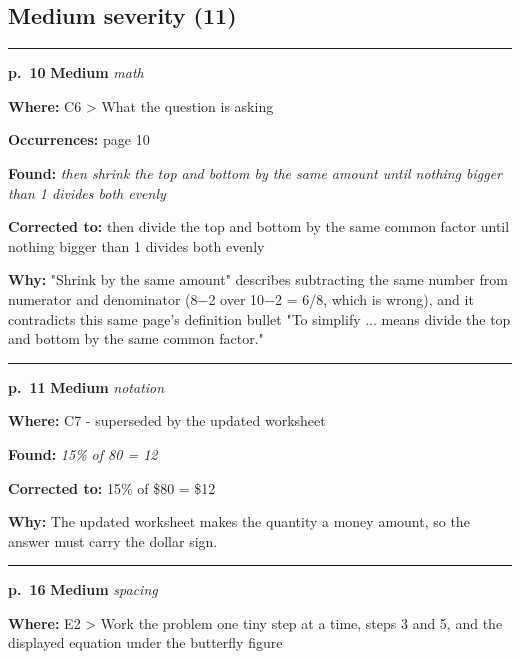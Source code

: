 \documentclass[11pt]{article}
\newcommand{\sevmed}[1]{\textcolor{orange!80!black}{\textbf{#1}}}
\begin{document}
\subsection*{Medium severity (11)}
\noindent\rule{\textwidth}{0.4pt}\par\nobreak\vspace{2pt}
\noindent\textbf{p.~10} \quad \sevmed{Medium} \quad \textit{math}\par
\noindent\textbf{Where: }C6 > What the question is asking\par
\noindent\textbf{Occurrences: }page 10\par
\noindent\textbf{Found: }\textit{then shrink the top and bottom by the same amount until nothing bigger than 1 divides both evenly}\par
\noindent\textbf{Corrected to: }then divide the top and bottom by the same common factor until nothing bigger than 1 divides both evenly\par
\noindent\textbf{Why: }"Shrink by the same amount" describes subtracting the same number from numerator and denominator (8$-$2 over 10$-$2 = 6/8, which is wrong), and it contradicts this same page's definition bullet "To simplify ... means divide the top and bottom by the same common factor."\par\vspace{4pt}
\noindent\rule{\textwidth}{0.4pt}\par\nobreak\vspace{2pt}
\noindent\textbf{p.~11} \quad \sevmed{Medium} \quad \textit{notation}\par
\noindent\textbf{Where: }C7 - superseded by the updated worksheet\par
\noindent\textbf{Found: }\textit{15\% of 80 = 12}\par
\noindent\textbf{Corrected to: }15\% of \$80 = \$12\par
\noindent\textbf{Why: }The updated worksheet makes the quantity a money amount, so the answer must carry the dollar sign.\par\vspace{4pt}
\noindent\rule{\textwidth}{0.4pt}\par\nobreak\vspace{2pt}
\noindent\textbf{p.~16} \quad \sevmed{Medium} \quad \textit{spacing}\par
\noindent\textbf{Where: }E2 > Work the problem one tiny step at a time, steps 3 and 5, and the displayed equation under the butterfly figure\par
\end{document}
